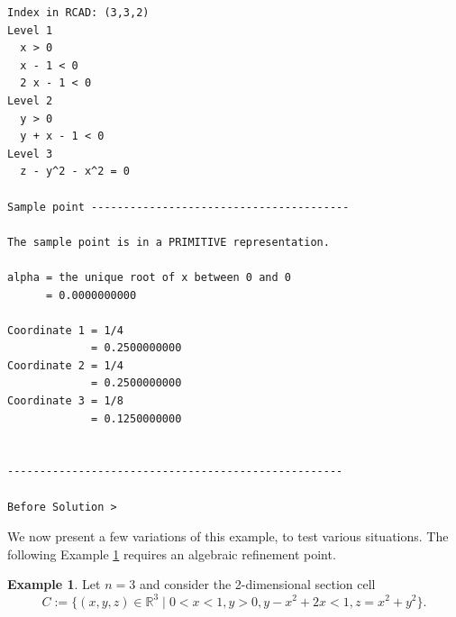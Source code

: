 \documentclass[
]{book}
\theoremstyle{definition}
\theoremstyle{definition}
\newtheorem{example}{Example}[chapter]
\theoremstyle{definition}
\theoremstyle{definition}
\theoremstyle{remark}
\begin{document}
\begin{verbatim}
Index in RCAD: (3,3,2)
Level 1
  x > 0
  x - 1 < 0
  2 x - 1 < 0
Level 2
  y > 0
  y + x - 1 < 0
Level 3
  z - y^2 - x^2 = 0

Sample point ----------------------------------------

The sample point is in a PRIMITIVE representation.

alpha = the unique root of x between 0 and 0
      = 0.0000000000

Coordinate 1 = 1/4
             = 0.2500000000
Coordinate 2 = 1/4
             = 0.2500000000
Coordinate 3 = 1/8
             = 0.1250000000


----------------------------------------------------

Before Solution >
\end{verbatim}

We now present a few variations of this example, to test various situations. The following Example \ref{exm:qanm-3-alg} requires an algebraic refinement point.

\begin{example}
\protect\hypertarget{exm:qanm-3-alg}{}\label{exm:qanm-3-alg}Let \(n = 3\) and consider the 2-dimensional section cell
\[
C := \{ (x,y,z) \in \mathbb{R}^3 \mid 0 < x < 1, y > 0, y - x^2 + 2x < 1, z = x^2 + y^2 \}.
\]
\end{example}
\end{document}
